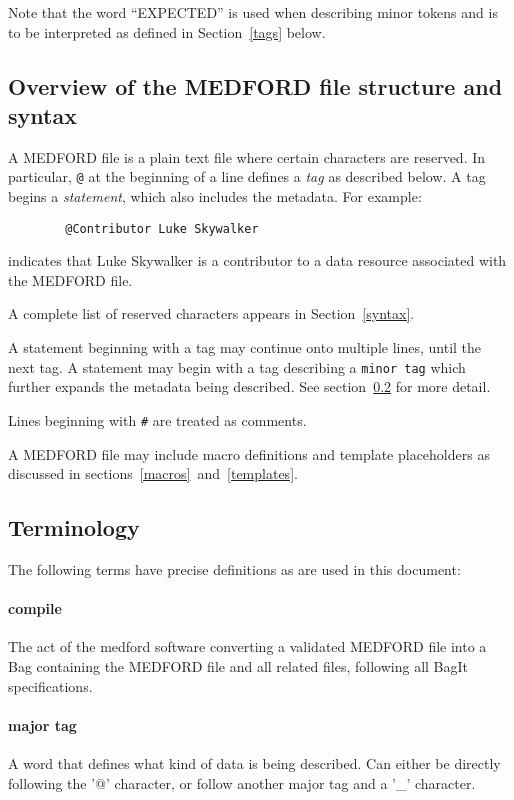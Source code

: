 \documentclass[10pt]{article}
\begin{document}
{{	    Note that the word ``EXPECTED'' is used when describing minor tokens and is to be interpreted as defined in Section~\ref{tags} below.
	}
	
	\subsection{Overview of the MEDFORD file structure and syntax}{
	
	A MEDFORD file is a plain text file where certain characters are reserved.
	In particular, \texttt{@} at the beginning of a line defines a \textit{tag} as described below. A tag begins a \textit{statement}, which also includes the metadata. For example:
	
	\begin{verbatim}
	    @Contributor Luke Skywalker
	\end{verbatim}
	
	indicates that Luke Skywalker is a contributor to a data resource associated with the MEDFORD file.
	
	A complete list of reserved characters appears in Section~\ref{syntax}.
	
	A statement beginning with a tag may continue onto multiple lines, until the next tag.
	A statement may begin with a tag describing a \texttt{minor tag} which further expands the metadata being described. See section~\ref{terminology} for more detail.
	
	Lines beginning with \texttt{\#} are treated as comments.
	
	A MEDFORD file may include macro definitions and template placeholders as discussed in sections~\ref{macros}~and~\ref{templates}.
	
	}
	\subsection{Terminology} \label{terminology} {
    	The following terms have precise definitions as are used in this document:
	    
	    \paragraph{compile} The act of the medford software converting a validated MEDFORD file into a Bag containing the MEDFORD file and all related files, following all BagIt specifications.

	    \paragraph{major tag} A word that defines what kind of data is being described. Can either be directly following the '@' character, or follow another major tag and a '\_' character.
	    
}}
\end{document}
